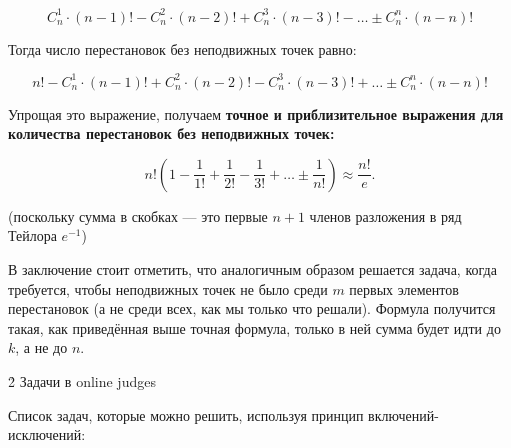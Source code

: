 $$ C_n^1 \cdot (n-1)! - C_n^2 \cdot (n-2)! + C_n^3 \cdot (n-3)! - \ldots \pm C_n^n \cdot (n-n)! $$

Тогда число перестановок без неподвижных точек равно:

$$ n! - C_n^1 \cdot (n-1)! + C_n^2 \cdot (n-2)! - C_n^3 \cdot (n-3)! + \ldots \pm C_n^n \cdot (n-n)! $$

Упрощая это выражение, получаем \bf{точное и приблизительное выражения для количества перестановок без неподвижных точек}:

$$ n! \left( 1 - \frac{1}{1!} + \frac{1}{2!} - \frac{1}{3!} + \ldots \pm \frac{1}{n!} \right) \approx \frac{n!}{e}. $$

(поскольку сумма в скобках --- это первые $n+1$ членов разложения в ряд Тейлора $e^{-1}$)

В заключение стоит отметить, что аналогичным образом решается задача, когда требуется, чтобы неподвижных точек не было среди $m$ первых элементов перестановок (а не среди всех, как мы только что решали). Формула получится такая, как приведённая выше точная формула, только в ней сумма будет идти до $k$, а не до $n$.



\h2{ Задачи в online judges }

Список задач, которые можно решить, используя принцип включений-исключений:

